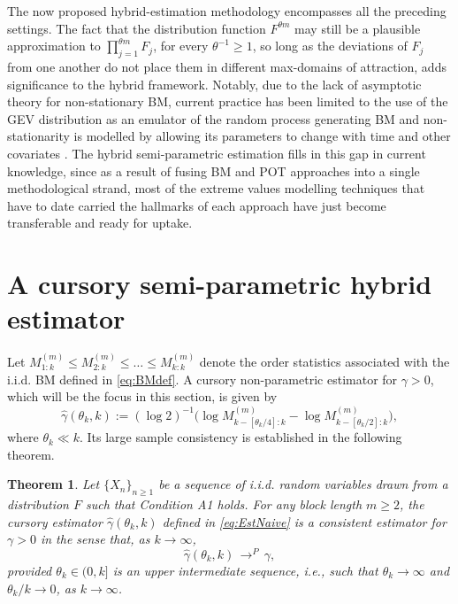 \documentclass[11pt, a4paper, oneside]{article}
\numberwithin{equation}{section}
\theoremstyle{plain}
\newtheorem{thm}{Theorem}
\theoremstyle{definition}
\newcommand{\conv}[1]{\ensuremath{\, \displaystyle {\mathop{\longrightarrow}^{#1}}}\, }
\begin{document}
The now proposed hybrid-estimation methodology encompasses all the preceding settings.
The fact that the distribution function $F^{\theta m}$ may still be a plausible approximation to $\prod_{j=1}^{\theta m}F_j$, for every $\theta^{-1} \geq 1$, so long as the deviations of $F_j$ from one another do not place them in different max-domains of attraction, adds significance to the hybrid framework.
 Notably, due to the lack of asymptotic theory for non-stationary BM, current practice has been limited to the use of the GEV distribution as an emulator of the random process generating BM and non-stationarity is modelled by allowing its parameters to change with time and other covariates \citep[see e.g.][]{DupuisTrapin23}. The hybrid semi-parametric estimation fills in this gap in current knowledge, since as a result of fusing BM and POT approaches into a single  methodological strand, most of the extreme values modelling techniques that have to date carried the hallmarks of each approach have just become transferable and ready for uptake.

\section{A cursory semi-parametric hybrid estimator}\label{Sec:CoEstim}

Let $M^{(m)}_{1:k} \leq M^{(m)}_{2:k} \leq \ldots \leq M^{(m)}_{k:k}$ denote the order statistics associated with the i.i.d. BM defined in \eqref{eq:BMdef}. A cursory non-parametric estimator for $\gamma >0$,  which will be the focus in this section, is given by
\begin{equation}\label{eq:EstNaive}
    \hat{\gamma}(\theta_k, k):= (\log 2)^{-1}\bigl( \log M^{(m)}_{k-[\theta_k/4]:k} - \log M^{(m)}_{k-[\theta_k/2]:k} \bigr),
\end{equation}
where $\theta_k \ll k$. Its large sample consistency is established in the following theorem.

\begin{thm}\label{Thm:ConsistencyNaive} Let $\{X_n\}_{n\geq 1}$ be a sequence of i.i.d. random variables drawn from a distribution $F$ such that Condition A1 holds. For any block length $m\geq 2$, the cursory estimator $\hat{\gamma}(\theta_k, k)$ defined in \eqref{eq:EstNaive} is a consistent estimator for $\gamma >0$ in the sense that, as $k \rightarrow \infty$,
\begin{equation*}
    \hat{\gamma}(\theta_k, k) \conv{P} \gamma, 
\end{equation*}
provided $\theta_k \in (0, k]$ is an upper intermediate sequence, i.e., such that $\theta_k \rightarrow \infty$ and $\theta_k/ k\rightarrow 0$, as $k \rightarrow \infty$.
\end{thm}
\end{document}
